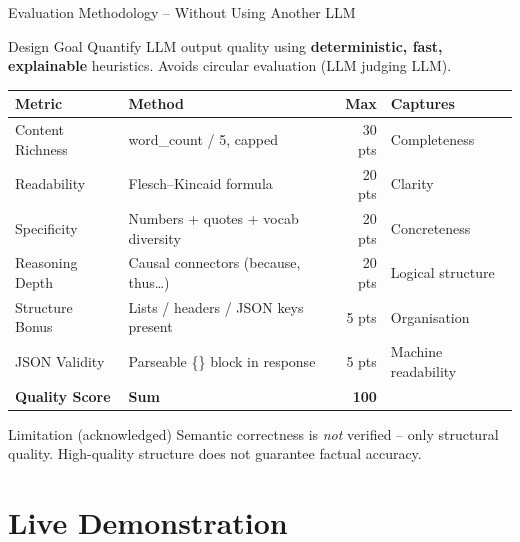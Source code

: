 \documentclass[aspectratio=169, 12pt]{beamer}
\begin{document}
\begin{frame}{Evaluation Methodology -- Without Using Another LLM}
  \begin{block}{Design Goal}
    Quantify LLM output quality using \textbf{deterministic, fast, explainable} heuristics.
    Avoids circular evaluation (LLM judging LLM).
  \end{block}
  \vspace{0.4em}
  \small
  \begin{tabular}{@{}llrl@{}}
    \toprule
    \textbf{Metric}        & \textbf{Method}                          & \textbf{Max} & \textbf{Captures} \\
    \midrule
    Content Richness       & word\_count / 5, capped                  & 30 pts & Completeness \\
    Readability            & Flesch--Kincaid formula                  & 20 pts & Clarity \\
    Specificity            & Numbers + quotes + vocab diversity       & 20 pts & Concreteness \\
    Reasoning Depth        & Causal connectors (because, thus\ldots)  & 20 pts & Logical structure \\
    Structure Bonus        & Lists / headers / JSON keys present      &  5 pts & Organisation \\
    JSON Validity          & Parseable \{\} block in response         &  5 pts & Machine readability \\
    \midrule
    \textbf{Quality Score} & \textbf{Sum}                             & \textbf{100} & \\
    \bottomrule
  \end{tabular}
  \vspace{0.4em}
  \begin{alertblock}{Limitation (acknowledged)}
    Semantic correctness is \emph{not} verified -- only structural quality.
    High-quality structure does not guarantee factual accuracy.
  \end{alertblock}
\end{frame}

\section{Live Demonstration}
\end{document}
